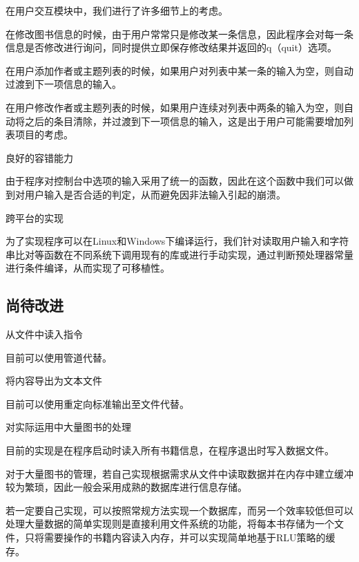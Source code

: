 \begin{DoxyEnumerate}
在用户交互模块中，我们进行了许多细节上的考虑。
\begin{DoxyItemize}
\item 在修改图书信息的时候，由于用户常常只是修改某一条信息，因此程序会对每一条信息是否修改进行询问，同时提供立即保存修改结果并返回的{\ttfamily q}（quit）选项。
\item 在用户添加作者或主题列表的时候，如果用户对列表中某一条的输入为空，则自动过渡到下一项信息的输入。
\item 在用户修改作者或主题列表的时候，如果用户连续对列表中两条的输入为空，则自动将之后的条目清除，并过渡到下一项信息的输入，这是出于用户可能需要增加列表项目的考虑。
\end{DoxyItemize}
\item 良好的容错能力

由于程序对控制台中选项的输入采用了统一的函数，因此在这个函数中我们可以做到对用户输入是否合适的判定，从而避免因非法输入引起的崩溃。
\item 跨平台的实现

为了实现程序可以在{\ttfamily Linux}和{\ttfamily Windows}下编译运行，我们针对读取用户输入和字符串比对等函数在不同系统下调用现有的库或进行手动实现，通过判断预处理器常量进行条件编译，从而实现了可移植性。
\end{DoxyEnumerate}

\subsection*{尚待改进}


\begin{DoxyEnumerate}
\item 从文件中读入指令

目前可以使用管道代替。
\item 将内容导出为文本文件

目前可以使用重定向标准输出至文件代替。
\item 对实际运用中大量图书的处理

目前的实现是在程序启动时读入所有书籍信息，在程序退出时写入数据文件。

对于大量图书的管理，若自己实现根据需求从文件中读取数据并在内存中建立缓冲较为繁琐，因此一般会采用成熟的数据库进行信息存储。

若一定要自己实现，可以按照常规方法实现一个数据库，而另一个效率较低但可以处理大量数据的简单实现则是直接利用文件系统的功能，将每本书存储为一个文件，只将需要操作的书籍内容读入内存，并可以实现简单地基于{\ttfamily R\-L\-U}策略的缓存。 
\end{DoxyEnumerate}